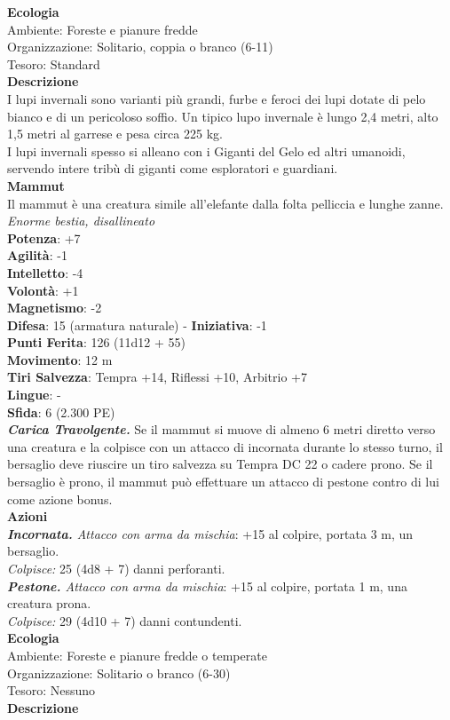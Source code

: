 \begin{multicols}{2}
\textbf{Ecologia}\\
Ambiente: Foreste e pianure fredde\\
Organizzazione: Solitario, coppia o branco (6-11)\\
Tesoro: Standard\\
\textbf{Descrizione}\\
I lupi invernali sono varianti più grandi, furbe e feroci dei lupi dotate di pelo bianco e di un pericoloso soffio. Un tipico lupo invernale è lungo 2,4 metri, alto 1,5 metri al garrese e pesa circa 225 kg.\\
I lupi invernali spesso si alleano con i Giganti del Gelo ed altri umanoidi, servendo intere tribù di giganti come esploratori e guardiani.\\

\medskip\textbf{Mammut}\\
Il mammut è una creatura simile all'elefante dalla folta pelliccia e lunghe zanne.\\
\emph{Enorme bestia, disallineato}\\
\textbf{Potenza}: +7\\
\textbf{Agilità}: -1\\
\textbf{Intelletto}: -4\\
\textbf{Volontà}: +1\\
\textbf{Magnetismo}: -2\\
\textbf{Difesa}: 15 (armatura naturale) - \textbf{Iniziativa}: -1\\
\textbf{Punti Ferita}: 126 (11d12 + 55)\\
\textbf{Movimento}: 12 m\\
\textbf{Tiri Salvezza}: Tempra +14, Riflessi +10, Arbitrio +7 \\
\textbf{Lingue}: -\\
\textbf{Sfida}: 6 (2.300 PE)\smallskip\\
\emph{\textbf{Carica Travolgente.}} Se il mammut si muove di almeno 6 metri diretto verso una creatura e la colpisce con un attacco di incornata durante lo stesso turno, il bersaglio deve riuscire un tiro salvezza su Tempra DC  22 o cadere prono. Se il bersaglio è prono, il mammut può effettuare un attacco di pestone contro di lui come azione bonus.\\
\smallskip\textbf{Azioni}\\
\emph{\textbf{Incornata.} Attacco con arma da mischia}: +15 al colpire, portata 3 m, un bersaglio.\\
\emph{Colpisce:} 25 (4d8 + 7) danni perforanti.\\
\emph{\textbf{Pestone.} Attacco con arma da mischia}: +15 al colpire, portata 1 m, una creatura prona.\\
\emph{Colpisce:} 29 (4d10 + 7) danni contundenti.\\
\textbf{Ecologia}\\
Ambiente: Foreste e pianure fredde o temperate\\
Organizzazione: Solitario o branco (6-30)\\
Tesoro: Nessuno\\
\textbf{Descrizione}\\


\end{multicols}
